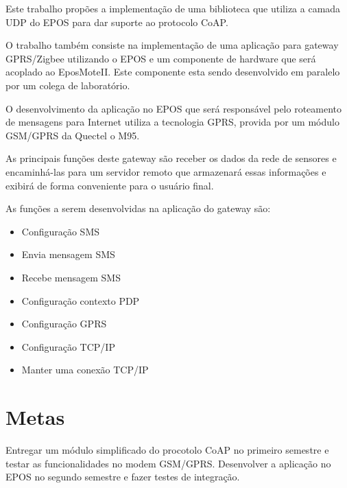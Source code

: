 Este trabalho prop\~oes a implementa\c{c}\~ao de uma biblioteca que utiliza a camada UDP do EPOS para dar suporte ao protocolo CoAP.

O trabalho tamb\'em consiste na implementa\c{c}\~ao de uma aplica\c{c}\~ao para gateway GPRS/Zigbee utilizando o EPOS e um componente de hardware que ser\'a acoplado ao EposMoteII. Este componente esta sendo desenvolvido em paralelo por um colega de laborat\'orio.

O desenvolvimento da aplica\c{c}\~ao no EPOS que ser\'a respons\'avel pelo roteamento de mensagens para Internet utiliza a tecnologia GPRS, provida por um m\'odulo GSM/GPRS da Quectel o M95.

As principais fun\c{c}\~oes deste gateway s\~ao receber os dados da rede de sensores e encaminh\'a-las para um servidor remoto que armazenar\'a essas informa\c{c}\~oes e exibir\'a de forma conveniente para o usu\'ario final.

As fun\c{c}\~oes a serem desenvolvidas na aplica\c{c}\~ao do gateway s\~ao:

\begin{itemize}[noitemsep,topsep=0pt,parsep=0pt,partopsep=0pt]
    \item Configura\c{c}\~ao SMS
    \item Envia mensagem SMS
    \item Recebe mensagem SMS
    \item Configura\c{c}\~ao contexto PDP
    \item Configura\c{c}\~ao GPRS
    \item Configura\c{c}\~ao TCP/IP
    \item Manter uma conex\~ao TCP/IP 
\end{itemize}

\section{Metas}
Entregar um m\'odulo simplificado do procotolo CoAP no primeiro semestre e testar as funcionalidades no modem GSM/GPRS.
Desenvolver a aplica\c{c}\~ao no EPOS no segundo semestre e fazer testes de integra\c{c}\~ao.

